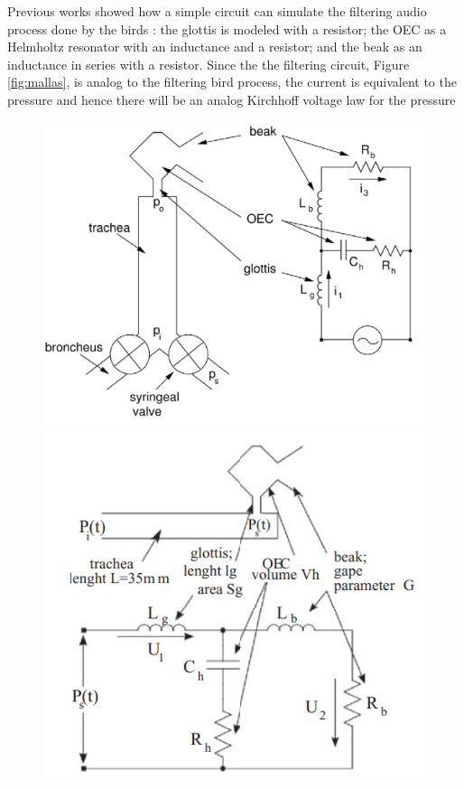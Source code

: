 \begin{itemize}
    Previous works showed how a simple circuit can simulate the filtering audio process done by the birds \cite{OEC_units, OEC_circuit} : the glottis is modeled with a resistor; the OEC as a Helmholtz resonator with an inductance and a resistor; and the beak as an inductance in series with a resistor. Since the the filtering circuit, Figure \ref{fig:mallas}, is analog to the filtering bird process, the current is equivalent to the pressure and hence there will be an analog Kirchhoff voltage law for the pressure

    \begin{figure}[H]
    \centering
    \begin{minipage}{.48\linewidth}
        \includegraphics[width=\linewidth]{Images/OEC.png}
        \caption{\cite{OEC_currents}}
        \label{fig:oec_old}
    \end{minipage}
    \hfill
    \begin{minipage}{.48\linewidth}
        \includegraphics[width=\linewidth]{Images/oec_new.png}

\end{minipage}
\end{figure}
\end{itemize}
